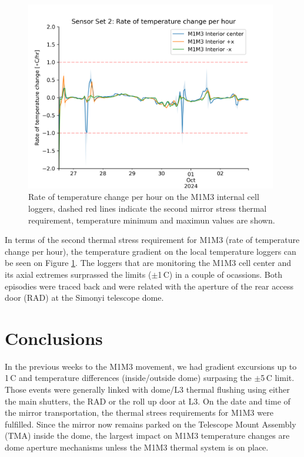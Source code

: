 \documentclass[SE,lsstdraft,authoryear,toc]{lsstdoc}
\begin{document}
\begin{figure}[h!]
  \centering 
  \includegraphics[width=11cm]{SITCOMTN-141_figures/Sensor2_1h_temp_derivative_int_center.png}
  \caption{Rate of temperature change per hour on the M1M3 internal cell loggers, dashed red lines indicate the second mirror stress thermal requirement, temperature minimum and maximun values are shown.}
  \label{fig_set2_derivative}
\end{figure}

In terms of the second thermal stress requirement for M1M3 (rate of temperature change per hour), the temperature gradient on the local temperature loggers can be seen on Figure \ref{fig_set2_derivative}. The loggers that are monitoring the M1M3 cell center and its axial extremes surprassed the limits ($\pm$1\,\textdegree C) in a couple of ocassions. Both episodies were traced back and were related with the aperture of the rear access door (RAD) at the Simonyi telescope dome.

\newpage
\section{Conclusions}
In the previous weeks to the M1M3 movement, we had gradient excursions up to 1\,\textdegree C and temperature differences (inside/outside dome) surpasing the $\pm$5\,\textdegree C limit. Those events were generally linked with dome/L3 thermal flushing using either the main shutters, the RAD or the roll up door at L3. On the date and time of the mirror transportation, the thermal strees requirements for M1M3 were fulfilled. Since the mirror now remains parked on the Telescope Mount Assembly (TMA) inside the dome, the largest impact on M1M3 temperature changes are dome aperture mechanisms unless the M1M3 thermal system is on place. 
\end{document}
